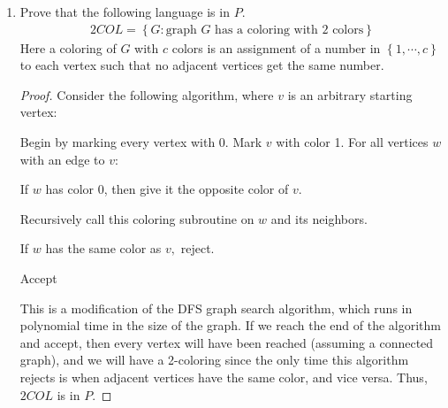 \documentclass{article}
\begin{document}
\begin{enumerate}
		\newpage
	\item Prove that the following language is in $P.$ 
		\begin{align*}
			2COL = \left\{ G:\text{graph } G\text{ has a coloring with 2 colors} \right\}
		\end{align*}
		Here a coloring of $G$ with $c$ colors is an assignment of a number in $\left\{ 1, \cdots, c \right\}$ to each vertex such that no adjacent vertices get the same number.
		\begin{proof}
			Consider the following algorithm, where $v$ is an arbitrary starting vertex:

			\begin{enumerate}[(1)]
				\ii Begin by marking every vertex with 0.
				\ii Mark $v$ with color 1.
				\ii For all vertices $w$ with an edge to $v:$
				\begin{enumerate}[(a)]
					\ii If $w$ has color 0, then give it the opposite color of $v.$
					\begin{enumerate}[(i)]
						\ii Recursively call this coloring subroutine on $w$ and its neighbors.
					\end{enumerate}
					\ii If $w$ has the same color as $v,$ reject.
				\end{enumerate}
				\ii Accept
			\end{enumerate}

			This is a modification of the DFS graph search algorithm, which runs in polynomial time in the size of the graph. If we reach the end of the algorithm and accept, then every vertex will have been reached (assuming a connected graph), and we will have a 2-coloring since the only time this algorithm rejects is when adjacent vertices have the same color, and vice versa. Thus, $2COL$ is in $P.$
		\end{proof}
		
\end{enumerate}
\end{document}
